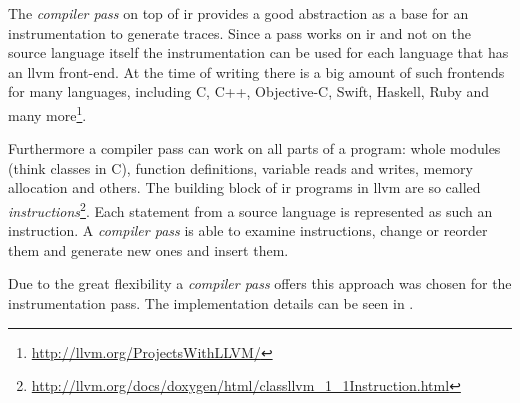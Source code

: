 The \emph{compiler pass} on top of \gls{ir} provides a good abstraction as a base for an instrumentation to generate traces.
Since a pass works on \gls{ir} and not on the source language itself the instrumentation can be used for each language that has an \gls{llvm} front-end.
At the time of writing there is a big amount of such frontends for many languages, including C, C++, Objective-C, Swift, Haskell, Ruby and many more\footnote{\url{http://llvm.org/ProjectsWithLLVM/}}.

Furthermore a compiler pass can work on all parts of a program: whole modules (think classes in C), function definitions, variable reads and writes, memory allocation and others.
The building block of \gls{ir} programs in \gls{llvm} are so called \emph{instructions}\footnote{\url{http://llvm.org/docs/doxygen/html/classllvm_1_1Instruction.html}}.
Each statement from a source language is represented as such an instruction.
A \emph{compiler pass} is able to examine instructions, change or reorder them and generate new ones and insert them.

Due to the great flexibility a \emph{compiler pass} offers this approach was chosen for the instrumentation pass.
The implementation details can be seen in .

